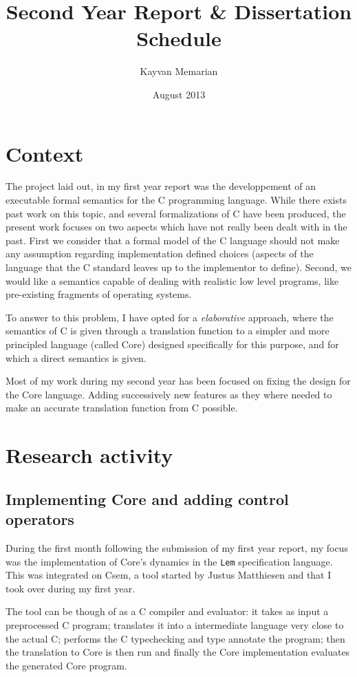 \documentclass[11pt,a4paper,twocolumn]{article}
\title{Second Year Report \& Dissertation Schedule}
\author{Kayvan Memarian}
\date{August 2013}
\begin{document}
\maketitle

\section*{Context}

{\color{blue} The project laid out, in my first year report was the
  developpement of an executable formal semantics for the C
  programming language. While there exists past work on this topic,
  and several formalizations of C have been produced, the present work
  focuses on two aspects which have not really been dealt with in the
  past. First we consider that a formal model of the C language should
  not make any assumption regarding implementation defined choices
  (aspects of the language that the C standard leaves up to the
  implementor to define). Second, we would like a semantics capable of
  dealing with realistic low level programs, like pre-existing
  fragments of operating systems.}

To answer to this problem, I have opted for a {\it elaborative}
approach, where the semantics of C is given through a translation
function to a simpler and more principled language (called Core)
designed specifically for this purpose, and for which a direct
semantics is given.

Most of my work during my second year has been focused on fixing the
design for the Core language. Adding successively new features as they
where needed to make an accurate translation function from C
possible. 


\section*{Research activity}

\subsection*{Implementing Core and adding control operators}
During the first month following the submission of my first year
report, my focus was the implementation of Core's dynamics in the
\texttt{Lem} specification language. This was integrated on Csem,
a tool started by Justus Matthiesen and that I took over during my
first year.

The tool can be though of as a C compiler and evaluator: it takes as
input a preprocessed C program; translates it into a intermediate
language very close to the actual C; performs the C typechecking and
type annotate the program; then the translation to Core is then run
and finally the Core implementation evaluates the generated Core
program.
\end{document}
